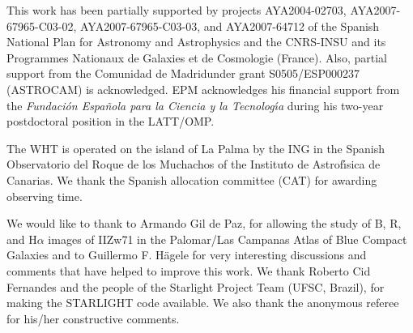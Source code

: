 \documentclass[structabstract]{aa}
\begin{document}
\begin{acknowledgements}
This work has been partially supported by projects AYA2004-02703, AYA2007-67965-C03-02, AYA2007-67965-C03-03, and AYA2007-64712
 of the Spanish National Plan for Astronomy and Astrophysics and the CNRS-INSU and its Programmes Nationaux de Galaxies et de Cosmologie (France). Also, partial support from the Comunidad de Madridunder grant S0505/ESP000237 (ASTROCAM) is acknowledged. EPM acknowledges his financial support from the {\em Fundaci\'on Espa\~nola para la Ciencia y la Tecnolog\'\i a} during his two-year postdoctoral position in the LATT/OMP.

The WHT is operated on the island of La Palma by the ING in the Spanish Observatorio del Roque de los
Muchachos of the Instituto de Astrof\'\i sica de Canarias. We thank the Spanish allocation committee (CAT)
for awarding observing time.

We would like to thank to Armando Gil de Paz, for allowing the study of B, R, and H$\alpha$ images of IIZw71 in the Palomar/Las Campanas Atlas of Blue Compact Galaxies
and to Guillermo F. H\"agele for very interesting discussions and comments that have helped to improve this work. 
We thank Roberto Cid Fernandes and
the people of the Starlight Project Team (UFSC, Brazil), for making the STARLIGHT code available. We also thank the anonymous referee
for his/her constructive comments.
\end{acknowledgements}
\end{document}
